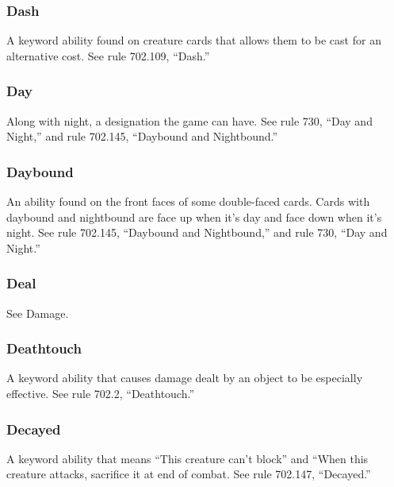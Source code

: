 {{{{{{\subsubsection*{Dash}

A keyword ability found on creature cards that allows them to be cast for an alternative cost. See rule 702.109, “Dash.”

\subsubsection*{Day}

Along with night, a designation the game can have. See rule 730, “Day and Night,” and rule 702.145, “Daybound and Nightbound.”

\subsubsection*{Daybound}

An ability found on the front faces of some double-faced cards. Cards with daybound and nightbound are face up when it’s day and face down when it’s night. See rule 702.145, “Daybound and Nightbound,” and rule 730, “Day and Night.”

\subsubsection*{Deal}

See Damage.

\subsubsection*{Deathtouch}

A keyword ability that causes damage dealt by an object to be especially effective. See rule 702.2, “Deathtouch.”

\subsubsection*{Decayed}

A keyword ability that means “This creature can’t block” and “When this creature attacks, sacrifice it at end of combat. See rule 702.147, “Decayed.”

}}}}}}
